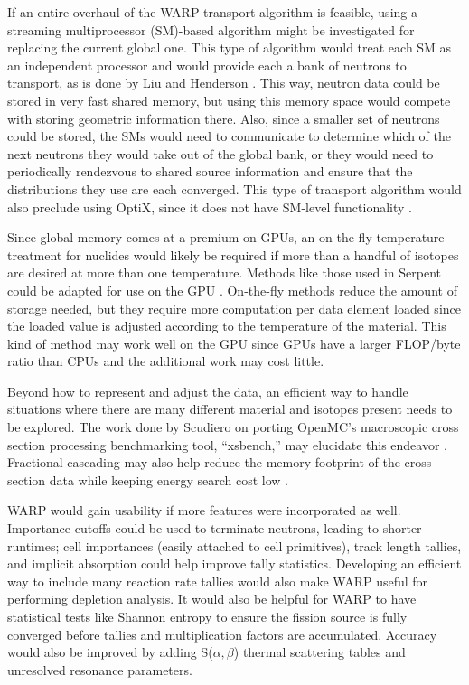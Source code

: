 \documentclass[preprint,12pt]{elsarticle}
\begin{document}
If an entire overhaul of the WARP transport algorithm is feasible, using a streaming multiprocessor (SM)-based algorithm might be investigated for replacing the current global one.  This type of algorithm would treat each SM as an independent processor and would provide each a bank of neutrons to transport, as is done by Liu and Henderson \cite{tianyu,henderson}.   This way, neutron data could be stored in very fast shared memory, but using this memory space would compete with storing geometric information there.  Also, since a smaller set of neutrons could be stored, the SMs would need to communicate to determine which of the next neutrons they would take out of the global bank, or they would need to periodically rendezvous to shared source information and ensure that the distributions they use are each converged.  This type of transport algorithm would also preclude using OptiX, since it does not have SM-level functionality \cite{optix}.

Since global memory comes at a premium on GPUs, an on-the-fly temperature treatment for nuclides would likely be required if more than a handful of isotopes are desired at more than one temperature.  Methods like those used in Serpent could be adapted for use on the GPU \cite{serpent}.  On-the-fly methods reduce the amount of storage needed, but they require more computation per data element loaded since the loaded value is adjusted according to the temperature of the material.  This kind of method may work well on the GPU since GPUs have a larger FLOP/byte ratio than CPUs and the additional work may cost little.  

Beyond how to represent and adjust the data, an efficient way to handle situations where there are many different material and isotopes present needs to be explored.  The work done by Scudiero on porting OpenMC's macroscopic cross section processing benchmarking tool, ``xsbench,'' may elucidate this endeavor \cite{openmc,scudiero}.   Fractional cascading may also help reduce the memory footprint of the cross section data while keeping energy search cost low \cite{Lund2015}.

WARP would gain usability if more features were incorporated as well.  Importance cutoffs could be used to terminate neutrons, leading to shorter runtimes; cell importances (easily attached to cell primitives), track length tallies, and implicit absorption could help improve tally statistics.  Developing an efficient way to include many reaction rate tallies would also make WARP useful for performing depletion analysis.  It would also be helpful for WARP to have statistical tests like Shannon entropy to ensure the fission source is fully converged before tallies and multiplication factors are accumulated.  Accuracy would also be improved by adding S($\alpha,\beta$) thermal scattering tables and unresolved resonance parameters.
\end{document}
